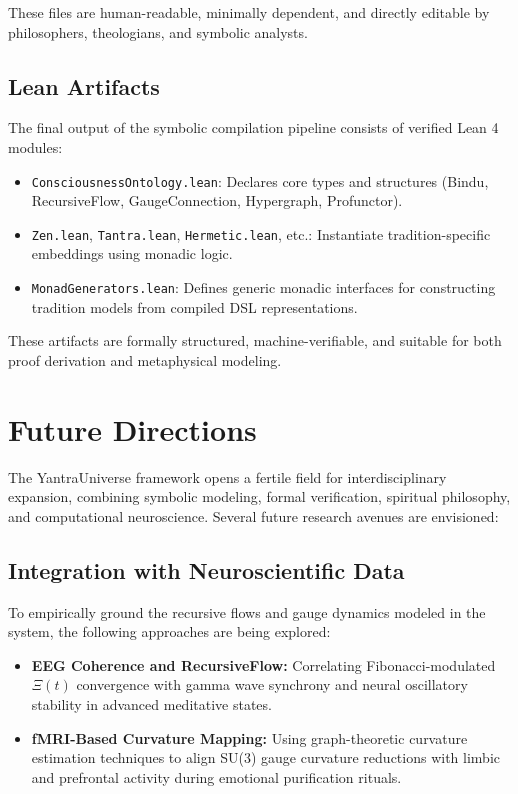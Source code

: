 \documentclass[12pt]{article}
\theoremstyle{plain}
\begin{document}
These files are human-readable, minimally dependent, and directly editable by philosophers, theologians, and symbolic analysts.

\subsection{Lean Artifacts}

The final output of the symbolic compilation pipeline consists of verified Lean 4 modules:

\begin{itemize}
  \item \texttt{ConsciousnessOntology.lean}: Declares core types and structures (Bindu, RecursiveFlow, GaugeConnection, Hypergraph, Profunctor).
  \item \texttt{Zen.lean}, \texttt{Tantra.lean}, \texttt{Hermetic.lean}, etc.: Instantiate tradition-specific embeddings using monadic logic.
  \item \texttt{MonadGenerators.lean}: Defines generic monadic interfaces for constructing tradition models from compiled DSL representations.
\end{itemize}

These artifacts are formally structured, machine-verifiable, and suitable for both proof derivation and metaphysical modeling.

\section{Future Directions}

The YantraUniverse framework opens a fertile field for interdisciplinary expansion, combining symbolic modeling, formal verification, spiritual philosophy, and computational neuroscience. Several future research avenues are envisioned:

\subsection{Integration with Neuroscientific Data}

To empirically ground the recursive flows and gauge dynamics modeled in the system, the following approaches are being explored:

\begin{itemize}
  \item \textbf{EEG Coherence and RecursiveFlow:} Correlating Fibonacci-modulated $\Xi(t)$ convergence with gamma wave synchrony and neural oscillatory stability in advanced meditative states.
  \item \textbf{fMRI-Based Curvature Mapping:} Using graph-theoretic curvature estimation techniques to align SU(3) gauge curvature reductions with limbic and prefrontal activity during emotional purification rituals.
\end{itemize}
\end{document}
